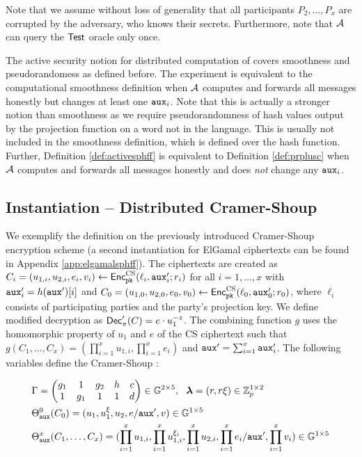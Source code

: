 \noindent
Note that we assume without loss of generality that all participants $P_2,\dots,P_x$ are corrupted by the adversary, who knows their secrets.
Furthermore, note that $\mathcal{A}$ can query the $\mathsf{Test}$ oracle only once.

The active security notion for distributed computation of \SPHFF covers smoothness and pseudorandomess as defined before.
The experiment is equivalent to the computational smoothness definition when $\mathcal{A}$ computes and forwards all messages honestly but changes at least one $\mathtt{aux}_i$.
Note that this is actually a stronger notion than smoothness as we require pseudorandomness of hash values output by the projection function on a word not in the language.
This is usually not included in the smoothness definition, which is defined over the hash function.
Further, Definition \ref{def:activesphff} is equivalent to Definition \ref{def:prplusc} when $\mathcal{A}$ computes and forwards all messages honestly and does \emph{not} change any $\mathtt{aux}_i$.

\subsection[Instantiation -- Distributed Cramer-Shoup SPHFx]{Instantiation -- Distributed Cramer-Shoup \SPHFF}\label{sec:dcssphf}
We exemplify the \SPHFF definition on the previously introduced Cramer-Shoup encryption scheme (a second instantiation for ElGamal ciphertexts can be found in Appendix \ref{app:elgamalsphff}).
The ciphertexts are created as $C_i=(u_{1,i},u_{2,i},e_{i},v_i)\gets\mathsf{Enc}^{\mathrm{CS}}_{\mathtt{pk}}(\ell_i,\mathtt{aux}'_i;r_i)$ for all $i=1,\dots,x$ with $\mathtt{aux}'_i=h(\mathtt{aux}')[i]$ and $C_0=(u_{1,0},u_{2,0},\allowbreak e_{0},v_0)\gets\mathsf{Enc}^{\mathrm{CS}}_{\mathtt{pk}}(\ell_0,\allowbreak \mathtt{aux}'_0;r_0)$, where $\ell_i$ consists of participating parties and the party's projection key.
We define modified decryption as $\mathsf{Dec}'_\pi(C)=e\cdot u_1^{-z}$.
The combining function $g$ uses the homomorphic property of $u_1$ and $e$ of the CS ciphertext such that $g(C_1,\dots,C_x)=(\prod^x_{i=1}u_{1,i},\prod^x_{i=1}e_i)$ and $\mathtt{aux}'=\sum_{i=1}^{x}\mathtt{aux}'_i$.
The following variables define the Cramer-Shoup \SPHFF:

\begin{align*}
& \Gamma=
		\begin{pmatrix}
			g_1 & 1 & g_2 & h & c \\
			1 & g_1 & 1 & 1 & d
		\end{pmatrix} \in \mathbb{G}^{2\times 5},~~
		{\bm \lambda}=(r, r\xi)\in\mathbb{Z}_p^{1\times 2} \\
& \Theta^0_{\mathtt{aux}}(C_0)=(u_1,u_1^\xi,u_2,e/\mathtt{aux}',v)\in\mathbb{G}^{1\times 5} \\
& \Theta^x_{\mathtt{aux}}(C_1,\dots,C_x)=(\prod^x_{i=1}u_{1,i},\prod^x_{i=1}u_{1,i}^{\xi_i},\prod^x_{i=1}u_{2,i},\prod^x_{i=1}e_i/\mathtt{aux}',\prod^x_{i=1}v_i)\in\mathbb{G}^{1\times 5}
\end{align*}

